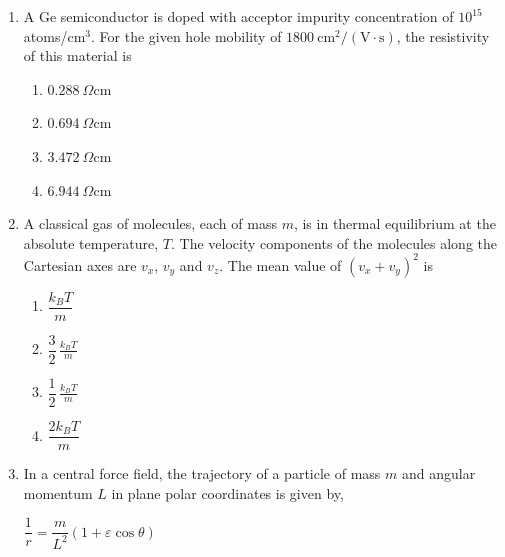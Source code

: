 \documentclass[journal,12pt,onecolumn]{IEEEtran}
\theoremstyle{remark}
\begin{document}
\begin{enumerate}
\item A Ge semiconductor is doped with acceptor impurity concentration of $10^{15}$ atoms/cm$^{3}$. For the given hole mobility of $1800\ \mathrm{cm^{2}/(V\cdot s)}$, the resistivity of this material is
\begin{multicols}{4}
\begin{enumerate}
\item $0.288\ \Omega\mathrm{cm}$
\item $0.694\ \Omega\mathrm{cm}$
\item $3.472\ \Omega\mathrm{cm}$
\item $6.944\ \Omega\mathrm{cm}$
\end{enumerate}
\end{multicols}

\item A classical gas of molecules, each of mass $m$, is in thermal equilibrium at the absolute temperature, $T$. The velocity components of the molecules along the Cartesian axes are $v_x$, $v_y$ and $v_z$. The mean value of $\left( v_x+v_y \right)^{2}$ is
\begin{multicols}{4}
\begin{enumerate}
\item $\dfrac{k_{B}T}{m}$
\item $\dfrac{3}{2}\,\tfrac{k_{B}T}{m}$
\item $\dfrac{1}{2}\,\tfrac{k_{B}T}{m}$
\item $\dfrac{2k_{B}T}{m}$
\end{enumerate}
\end{multicols}

\item In a central force field, the trajectory of a particle of mass $m$ and angular momentum $L$ in plane polar coordinates is given by,

$\dfrac{1}{r} = \dfrac{m}{L^{2}}(1+\varepsilon \cos\theta)$


\end{enumerate}
\end{document}
